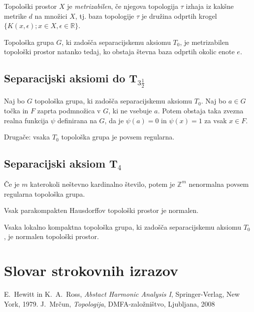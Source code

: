 \documentclass[mat1]{fmfdelo}
\newcommand{\R}{\mathbb R}
\newcommand{\Z}{\mathbb Z}
\begin{document}
\begin{definicija}\label{def:metrizabilnost}
Topološki prostor $X$ je \emph{metrizabilen}, če njegova topologija $\tau$ izhaja iz kakšne metrike $d$ na množici $X$, tj. baza topologije $\tau$ je družina odprtih krogel $\lbrace K(x, \epsilon); x \in X, \epsilon \in \R \rbrace$.
\end{definicija}

\begin{izrek}\label{izr:metrizabilnost}
	Topološka grupa $G$, ki zadošča separacijskemu aksiomu $T_0$, je metrizabilen topološki prostor natanko tedaj, ko obstaja števna baza odprtih okolic enote $e$.
\end{izrek}

\subsection{Separacijski aksiomi do T$_{3 \frac{1}{2}}$}

\begin{izrek}\label{izr:t3pol}
	Naj bo $G$ topološka grupa, ki zadošča separacijskemu aksiomu $T_0$. Naj bo $a \in G$ točka in $F$ zaprta podmnožica v $G$, ki ne vsebuje $a$. Potem obstaja taka zvezna realna funkcija $\psi$ definirana na $G$, da je $\psi (a) = 0$ in $\psi (x) = 1$ za vsak $x \in F$.
	
	Drugače: vsaka $T_0$ topološka grupa je povsem regularna.
\end{izrek}

\subsection{Separacijski aksiom T$_4$}
\begin{izrek}\label{izr:t4protiprimer}
	Če je $m$ katerokoli neštevno kardinalno število, potem je $\Z^{m}$ nenormalna povsem regularna topološka grupa.
\end{izrek}

\begin{trditev}\label{trd:parkompnorm} %
Vsak parakompakten Hausdorffov topološki prostor je normalen.
\end{trditev}

\begin{izrek}\label{izr:t4}
	Vsaka lokalno kompaktna topološka grupa, ki zadošča separacijskemu aksiomu $T_0$, je normalen topološki prostor.
\end{izrek}

\section*{Slovar strokovnih izrazov}

\geslo{}{}
\geslo{}{}

\begin{thebibliography}{99}

E.~Hewitt in K.~A.~Ross, \emph{Abstact Harmonic Analysis I}, Springer-Verlag, New York, 1979.
J.~Mrčun, \emph{Topologija}, DMFA-založništvo, Ljubljana, 2008

\end{thebibliography}
\end{document}
